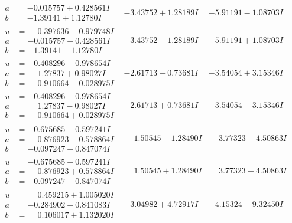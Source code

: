 \documentclass[1p]{elsarticle_modified}
\theoremstyle{definition}
\begin{document}
$$\begin{array}{c|c|c}
\begin{aligned}
a &= -0.015757 + 0.428561 I \\
b &= -1.39141 + 1.12780 I\end{aligned}
 & -3.43752 + 1.28189 I & -5.91191 - 1.08703 I \\ \hline\begin{aligned}
u &= \phantom{-}0.397636 - 0.979748 I \\
a &= -0.015757 - 0.428561 I \\
b &= -1.39141 - 1.12780 I\end{aligned}
 & -3.43752 - 1.28189 I & -5.91191 + 1.08703 I \\ \hline\begin{aligned}
u &= -0.408296 + 0.978654 I \\
a &= \phantom{-}1.27837 + 0.98027 I \\
b &= \phantom{-}0.910664 - 0.028975 I\end{aligned}
 & -2.61713 - 0.73681 I & -3.54054 + 3.15346 I \\ \hline\begin{aligned}
u &= -0.408296 - 0.978654 I \\
a &= \phantom{-}1.27837 - 0.98027 I \\
b &= \phantom{-}0.910664 + 0.028975 I\end{aligned}
 & -2.61713 + 0.73681 I & -3.54054 - 3.15346 I \\ \hline\begin{aligned}
u &= -0.675685 + 0.597241 I \\
a &= \phantom{-}0.876923 - 0.578864 I \\
b &= -0.097247 - 0.847074 I\end{aligned}
 & \phantom{-}1.50545 - 1.28490 I & \phantom{-}3.77323 + 4.50863 I \\ \hline\begin{aligned}
u &= -0.675685 - 0.597241 I \\
a &= \phantom{-}0.876923 + 0.578864 I \\
b &= -0.097247 + 0.847074 I\end{aligned}
 & \phantom{-}1.50545 + 1.28490 I & \phantom{-}3.77323 - 4.50863 I \\ \hline\begin{aligned}
u &= \phantom{-}0.459215 + 1.005020 I \\
a &= -0.284902 + 0.841083 I \\
b &= \phantom{-}0.106017 + 1.132020 I\end{aligned}
 & -3.04982 + 4.72917 I & -4.15324 - 9.32450 I \\ \hline\begin{aligned}

\end{aligned}
\end{array}$$
\end{document}
